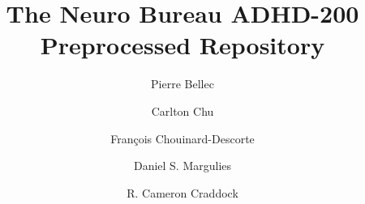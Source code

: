 \documentclass[preprint,12pt,3p]{elsarticle}
\begin{document}
\begin{frontmatter}

\title{The Neuro Bureau ADHD-200 Preprocessed Repository}


\author[label0,label1,label2]{Pierre Bellec}
\address[label0]{The Neuro Bureau}
\address[label1]{Centre de Recherche de l'Institut Universitaire de G\'eriatrie de Montr\'eal, Montr\'eal, CA}
\address[label2]{D\'epartement d'Informatique et de Recherche Op\'erationnelle, Universit\'e de Montr\'eal, Montr\'eal, CA}



\author[label0,label3]{Carlton Chu}
\address[label3]{Google DeepMind, London, UK}

\author[label0,label1,label4]{Fran\c{c}ois Chouinard-Descorte}
\address[label4]{Integrated Program in Neuroscience, McGill University, Montreal, CA}

\author[label0,label5]{Daniel S. Margulies}
\address[label5]{Max Planck Research Group for Neuroanatomy \& Connectivity, Max Planck Institute for Human Cognitive and Brain Sciences, Leipzig, Germany}

\author[label0,lab6,lab7]{R. Cameron Craddock}
\address[lab6]{Computational Neuroimaging Laboratory, Center for Biomedical Imaging and Neuromodulation, Nathan S. Kline Institute for Psychiatric Research, Orangeburg, NY, USA}
\address[lab7]{Center for the Developing Brain, Child Mind Institute, New York, NY, USA}


\end{frontmatter}
\end{document}
